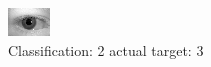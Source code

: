 \begin{figure}[h!]
\begin{center}
\includegraphics[width=0.60\columnwidth]{figures/ID631_class_2_target_3.png}
\end{center}
\caption{ Classification: 2 actual target: 3}
\label{fig:ID631_class_2_target_3}
\end{figure}

